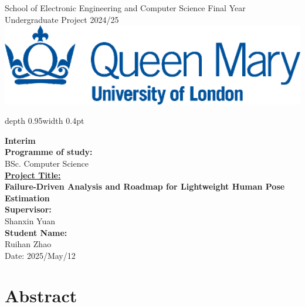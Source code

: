 \documentclass[a4paper,12pt]{article}
\renewcommand{\headrulewidth}{0.4pt}
\renewcommand{\headrulewidth}{0pt}
\newcommand{\removeheaderandfooter}{
  \pagestyle{empty}
  \fancyhead{}
  \fancyfoot{}
  \renewcommand{\headrulewidth}{0pt}
}
\begin{document}

\begin{titlepage}
\removeheaderandfooter
\noindent
\begin{minipage}[t][0.95\textheight][t]{0.48\textwidth}
\raggedright
{\fontsize{15}{18}\selectfont School of Electronic Engineering and Computer Science}
\vfill
{\fontsize{15}{18}\selectfont 
Final Year\\
Undergraduate Project 2024/25
}
\vspace{4em}\\
\includegraphics[width=0.6\linewidth]{qmul_logo.png} %
\end{minipage}
\hfill
\vrule depth 0.95\textheight width 0.4pt
\hfill
\begin{minipage}[t][0.95\textheight][t]{0.48\textwidth}
\raggedright
{\fontsize{14}{17}\selectfont
\textbf{Interim}\\ %
\textbf{Programme of study:}\\
BSc. Computer Science\\[4em]
}
{\fontsize{20}{24}\selectfont \uline{\textbf{Project Title:}}\\
\textbf{Failure-Driven Analysis and Roadmap for Lightweight Human Pose Estimation}\\[4em]
{\fontsize{14}{17}\selectfont
\textbf{Supervisor:}\\
Shanxin Yuan\\[4em]
\textbf{Student Name:}\\
Ruihan Zhao\\[4em]
\vfill
Date: 2025/May/12
}}
\end{minipage}
\end{titlepage}

\setcounter{page}{2}

\clearpage
\removeheaderandfooter
\section*{Abstract}


\clearpage
\pagestyle{plain}
\tableofcontents
\end{document}
